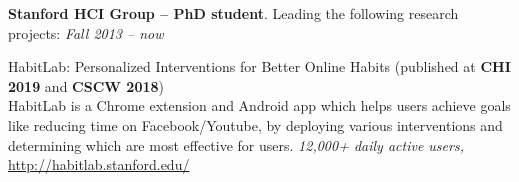 \documentclass[margin,line]{resume}
\begin{document}
\begin{resume}
\textbf{Stanford HCI Group -- PhD student}. Leading the following research projects: \hfill \textsl{Fall 2013 -- now}

\vspace{-2mm}

HabitLab: Personalized Interventions for Better Online Habits (published at \textbf{CHI 2019} and \textbf{CSCW 2018})\\
HabitLab is a Chrome extension and Android app which helps users achieve goals like reducing time on Facebook/Youtube, by deploying various interventions and determining which are most effective for users. \emph{12,000+ daily active users,} \url{http://habitlab.stanford.edu/}




\vspace{-2mm}


\end{resume}
\end{document}
